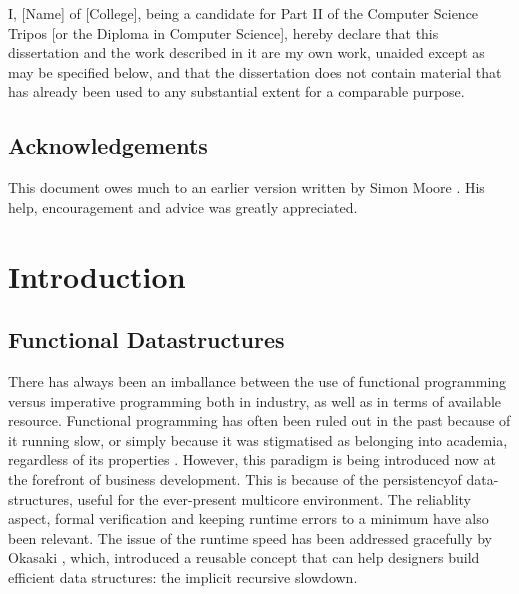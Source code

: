 \documentclass[12pt,twoside,notitlepage]{report}
\begin{document}
I, [Name] of [College], being a candidate for Part II of the Computer
Science Tripos [or the Diploma in Computer Science], hereby declare
that this dissertation and the work described in it are my own work,
unaided except as may be specified below, and that the dissertation
does not contain material that has already been used to any substantial
extent for a comparable purpose.

\bigskip
{}

\medskip
{}

\cleardoublepage

\tableofcontents

\listoffigures

\newpage
\section*{Acknowledgements}

This document owes much to an earlier version written by Simon Moore
\cite{moore95}.  His help, encouragement and advice was greatly
appreciated.


\cleardoublepage        %

\setcounter{page}{1}
\pagestyle{headings}

\chapter{Introduction}

\section{Functional Datastructures}

There has always been an imballance between the use of functional programming versus imperative programming both in
industry, as well as in terms of available resource. Functional programming has often been ruled out in the
past because of it running slow, or simply because it was stigmatised as belonging into academia, regardless of its
properties \cite{landin}. However, this paradigm
is being introduced now at the forefront of business development. This is because of the persistency\footnotemark[0] of data-structures,
useful for the ever-present multicore environment. The reliablity aspect, formal verification and
keeping runtime errors to a minimum have also been relevant.
The issue of the runtime speed has been addressed gracefully by Okasaki \cite{oka}, which, introduced a reusable concept
that can help designers build efficient data structures: the implicit recursive slowdown.
\end{document}
